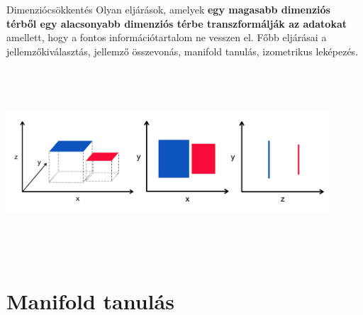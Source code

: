 \documentclass[english, aspectratio=169]{beamer}
\makeatletter
\let\origtableofcontents=\tableofcontents
\def\tableofcontents{\@ifnextchar[{\origtableofcontents}{\gobbletableofcontents}}
\def\gobbletableofcontents#1{\origtableofcontents}
\makeatother
\begin{document}
\begin{frame}{Dimenziócsökkentés}
Olyan eljárások, amelyek \textbf{egy magasabb dimenziós térből egy alacsonyabb dimenziós térbe transzformálják az adatokat} amellett, hogy a fontos információtartalom ne vesszen el. Főbb eljárásai a jellemzőkiválasztás, jellemző összevonás, manifold tanulás, izometrikus leképezés.\par\medskip
\begin{center}
\includegraphics[width=12cm, height=7cm, keepaspectratio]{images/unsupervised_2.png}
\end{center}
\end{frame}

\section{Manifold tanulás}

\begin{frame}
\tableofcontents[currentsection]
\end{frame}
\end{document}
